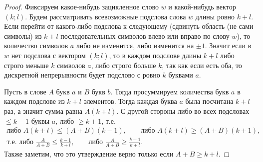 \documentclass[12pt,a4paper]{article}
\begin{document}
\begin{problem}{8}
\begin{enumerate}
                \begin{proof}
                    Фиксируем какое-нибудь зацикленное слово $w$ и какой-нибудь вектор $(k; l)$. Будем рассматривать всевозможные подслова слова $w$ длины ровно $k + l$. Если перейти от какого-либо подслова к следующему (сдвинуть область (не сами символы) из $k+l$ последовательных символов влево или вправо по слову $w$), то количество символов $a$ либо не изменится, либо изменится на $\pm 1$. Значит если в $w$ нет подслова с вектором $(k; l)$, то в каждом подслове длины $k+l$ либо строго меньше $k$ символов $a$, либо строго больше $k$, так как если есть оба, то дискретной непрерывности будет подслово с ровно $k$ буквами $a$.

                    Пусть в слове $A$ букв $a$ и $B$ букв $b$. Тогда просуммируем количества букв $a$ в каждом подслове из $k+l$ элементов. Тогда каждая буква $a$ была посчитана $k+l$ раз, а значит сумма равна $A(k+l)$. С другой стороны либо во всех подсловах $\leqslant k-1$ буквы $a$, либо $\geqslant k+1$, т.е.
                    \begin{gather*}
                        \text{либо } A(k+l) \leqslant (A+B)(k-1),
                        \qquad
                        \text{либо } A(k+l) \geqslant (A+B)(k+1),\\
                        \text{т.е. либо } \frac{A}{A+B} \leqslant \frac{k-1}{k+l},
                        \qquad
                        \text{либо } \frac{A}{A+B} \geqslant \frac{k+1}{k+l}.
                    \end{gather*}
                    Также заметим, что это утверждение верно только если $A+B \geqslant k+l$.


\end{proof}
\end{enumerate}
\end{problem}
\end{document}
